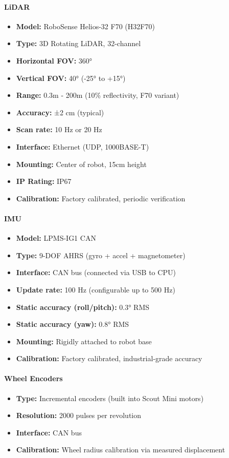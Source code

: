 \paragraph{LiDAR}
\begin{itemize}
    \item \textbf{Model:} RoboSense Helios-32 F70 (H32F70)
    \item \textbf{Type:} 3D Rotating LiDAR, 32-channel
    \item \textbf{Horizontal FOV:} 360°
    \item \textbf{Vertical FOV:} 40° (-25° to +15°)
    \item \textbf{Range:} 0.3m - 200m (10\% reflectivity, F70 variant)
    \item \textbf{Accuracy:} ±2 cm (typical)
    \item \textbf{Scan rate:} 10 Hz or 20 Hz
    \item \textbf{Interface:} Ethernet (UDP, 1000BASE-T)
    \item \textbf{Mounting:} Center of robot, 15cm height
    \item \textbf{IP Rating:} IP67
    \item \textbf{Calibration:} Factory calibrated, periodic verification
\end{itemize}

\paragraph{IMU}
\begin{itemize}
    \item \textbf{Model:} LPMS-IG1 CAN
    \item \textbf{Type:} 9-DOF AHRS (gyro + accel + magnetometer)
    \item \textbf{Interface:} CAN bus (connected via USB to CPU)
    \item \textbf{Update rate:} 100 Hz (configurable up to 500 Hz)
    \item \textbf{Static accuracy (roll/pitch):} 0.3° RMS
    \item \textbf{Static accuracy (yaw):} 0.8° RMS
    \item \textbf{Mounting:} Rigidly attached to robot base
    \item \textbf{Calibration:} Factory calibrated, industrial-grade accuracy
\end{itemize}

\paragraph{Wheel Encoders}
\begin{itemize}
    \item \textbf{Type:} Incremental encoders (built into Scout Mini motors)
    \item \textbf{Resolution:} 2000 pulses per revolution
    \item \textbf{Interface:} CAN bus
    \item \textbf{Calibration:} Wheel radius calibration via measured displacement
\end{itemize}

